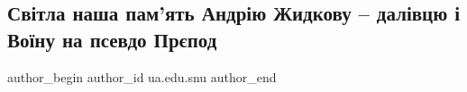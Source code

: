  
 
 
 
 
 
\subsection{Світла наша пам’ять Андрію Жидкову – далівцю і Воїну на псевдо Прєпод}
\label{sec:04_11_2022.fb.ua.edu.snu.1.andrij_zhidkov}
 
\ifcmt
 author_begin
   author_id ua.edu.snu
 author_end
\fi

